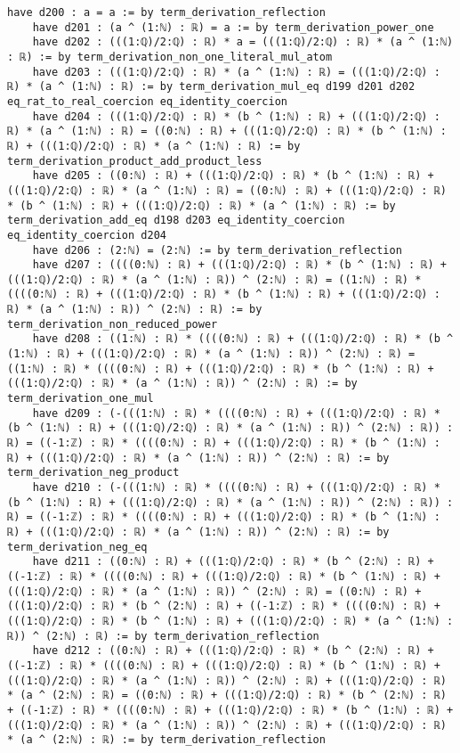 \documentclass{article}
\begin{document}
\begin{tcolorbox}[colback=white!10, width=\linewidth]
\begin{lstlisting}[language=Lean4]
    have d200 : a = a := by term_derivation_reflection
    have d201 : (a ^ (1:ℕ) : ℝ) = a := by term_derivation_power_one
    have d202 : (((1:ℚ)/2:ℚ) : ℝ) * a = (((1:ℚ)/2:ℚ) : ℝ) * (a ^ (1:ℕ) : ℝ) := by term_derivation_non_one_literal_mul_atom
    have d203 : (((1:ℚ)/2:ℚ) : ℝ) * (a ^ (1:ℕ) : ℝ) = (((1:ℚ)/2:ℚ) : ℝ) * (a ^ (1:ℕ) : ℝ) := by term_derivation_mul_eq d199 d201 d202 eq_rat_to_real_coercion eq_identity_coercion
    have d204 : (((1:ℚ)/2:ℚ) : ℝ) * (b ^ (1:ℕ) : ℝ) + (((1:ℚ)/2:ℚ) : ℝ) * (a ^ (1:ℕ) : ℝ) = ((0:ℕ) : ℝ) + (((1:ℚ)/2:ℚ) : ℝ) * (b ^ (1:ℕ) : ℝ) + (((1:ℚ)/2:ℚ) : ℝ) * (a ^ (1:ℕ) : ℝ) := by term_derivation_product_add_product_less
    have d205 : ((0:ℕ) : ℝ) + (((1:ℚ)/2:ℚ) : ℝ) * (b ^ (1:ℕ) : ℝ) + (((1:ℚ)/2:ℚ) : ℝ) * (a ^ (1:ℕ) : ℝ) = ((0:ℕ) : ℝ) + (((1:ℚ)/2:ℚ) : ℝ) * (b ^ (1:ℕ) : ℝ) + (((1:ℚ)/2:ℚ) : ℝ) * (a ^ (1:ℕ) : ℝ) := by term_derivation_add_eq d198 d203 eq_identity_coercion eq_identity_coercion d204
    have d206 : (2:ℕ) = (2:ℕ) := by term_derivation_reflection
    have d207 : ((((0:ℕ) : ℝ) + (((1:ℚ)/2:ℚ) : ℝ) * (b ^ (1:ℕ) : ℝ) + (((1:ℚ)/2:ℚ) : ℝ) * (a ^ (1:ℕ) : ℝ)) ^ (2:ℕ) : ℝ) = ((1:ℕ) : ℝ) * ((((0:ℕ) : ℝ) + (((1:ℚ)/2:ℚ) : ℝ) * (b ^ (1:ℕ) : ℝ) + (((1:ℚ)/2:ℚ) : ℝ) * (a ^ (1:ℕ) : ℝ)) ^ (2:ℕ) : ℝ) := by term_derivation_non_reduced_power
    have d208 : ((1:ℕ) : ℝ) * ((((0:ℕ) : ℝ) + (((1:ℚ)/2:ℚ) : ℝ) * (b ^ (1:ℕ) : ℝ) + (((1:ℚ)/2:ℚ) : ℝ) * (a ^ (1:ℕ) : ℝ)) ^ (2:ℕ) : ℝ) = ((1:ℕ) : ℝ) * ((((0:ℕ) : ℝ) + (((1:ℚ)/2:ℚ) : ℝ) * (b ^ (1:ℕ) : ℝ) + (((1:ℚ)/2:ℚ) : ℝ) * (a ^ (1:ℕ) : ℝ)) ^ (2:ℕ) : ℝ) := by term_derivation_one_mul
    have d209 : (-(((1:ℕ) : ℝ) * ((((0:ℕ) : ℝ) + (((1:ℚ)/2:ℚ) : ℝ) * (b ^ (1:ℕ) : ℝ) + (((1:ℚ)/2:ℚ) : ℝ) * (a ^ (1:ℕ) : ℝ)) ^ (2:ℕ) : ℝ)) : ℝ) = ((-1:ℤ) : ℝ) * ((((0:ℕ) : ℝ) + (((1:ℚ)/2:ℚ) : ℝ) * (b ^ (1:ℕ) : ℝ) + (((1:ℚ)/2:ℚ) : ℝ) * (a ^ (1:ℕ) : ℝ)) ^ (2:ℕ) : ℝ) := by term_derivation_neg_product
    have d210 : (-(((1:ℕ) : ℝ) * ((((0:ℕ) : ℝ) + (((1:ℚ)/2:ℚ) : ℝ) * (b ^ (1:ℕ) : ℝ) + (((1:ℚ)/2:ℚ) : ℝ) * (a ^ (1:ℕ) : ℝ)) ^ (2:ℕ) : ℝ)) : ℝ) = ((-1:ℤ) : ℝ) * ((((0:ℕ) : ℝ) + (((1:ℚ)/2:ℚ) : ℝ) * (b ^ (1:ℕ) : ℝ) + (((1:ℚ)/2:ℚ) : ℝ) * (a ^ (1:ℕ) : ℝ)) ^ (2:ℕ) : ℝ) := by term_derivation_neg_eq
    have d211 : ((0:ℕ) : ℝ) + (((1:ℚ)/2:ℚ) : ℝ) * (b ^ (2:ℕ) : ℝ) + ((-1:ℤ) : ℝ) * ((((0:ℕ) : ℝ) + (((1:ℚ)/2:ℚ) : ℝ) * (b ^ (1:ℕ) : ℝ) + (((1:ℚ)/2:ℚ) : ℝ) * (a ^ (1:ℕ) : ℝ)) ^ (2:ℕ) : ℝ) = ((0:ℕ) : ℝ) + (((1:ℚ)/2:ℚ) : ℝ) * (b ^ (2:ℕ) : ℝ) + ((-1:ℤ) : ℝ) * ((((0:ℕ) : ℝ) + (((1:ℚ)/2:ℚ) : ℝ) * (b ^ (1:ℕ) : ℝ) + (((1:ℚ)/2:ℚ) : ℝ) * (a ^ (1:ℕ) : ℝ)) ^ (2:ℕ) : ℝ) := by term_derivation_reflection
    have d212 : ((0:ℕ) : ℝ) + (((1:ℚ)/2:ℚ) : ℝ) * (b ^ (2:ℕ) : ℝ) + ((-1:ℤ) : ℝ) * ((((0:ℕ) : ℝ) + (((1:ℚ)/2:ℚ) : ℝ) * (b ^ (1:ℕ) : ℝ) + (((1:ℚ)/2:ℚ) : ℝ) * (a ^ (1:ℕ) : ℝ)) ^ (2:ℕ) : ℝ) + (((1:ℚ)/2:ℚ) : ℝ) * (a ^ (2:ℕ) : ℝ) = ((0:ℕ) : ℝ) + (((1:ℚ)/2:ℚ) : ℝ) * (b ^ (2:ℕ) : ℝ) + ((-1:ℤ) : ℝ) * ((((0:ℕ) : ℝ) + (((1:ℚ)/2:ℚ) : ℝ) * (b ^ (1:ℕ) : ℝ) + (((1:ℚ)/2:ℚ) : ℝ) * (a ^ (1:ℕ) : ℝ)) ^ (2:ℕ) : ℝ) + (((1:ℚ)/2:ℚ) : ℝ) * (a ^ (2:ℕ) : ℝ) := by term_derivation_reflection

\end{lstlisting}
\end{tcolorbox}
\end{document}

